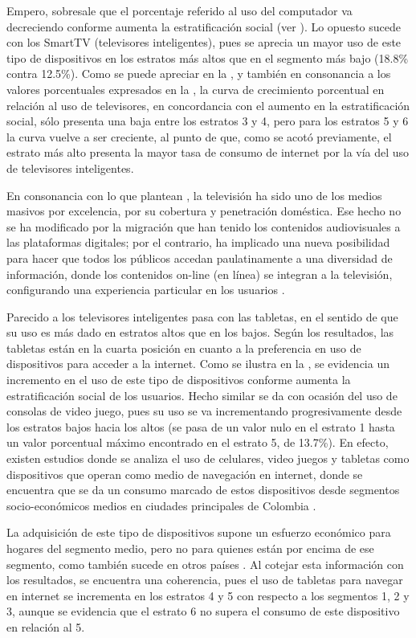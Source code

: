 \documentclass[spanish]{textolivre}
\begin{document}
Empero, sobresale que el porcentaje referido al uso del computador va decreciendo conforme aumenta la estratificación social (ver ). Lo opuesto sucede con los SmartTV (televisores inteligentes), pues se aprecia un mayor uso de este tipo de dispositivos en los estratos más altos que en el segmento más bajo (18.8\% contra 12.5\%). Como se puede apreciar en la , y también en consonancia a los valores porcentuales expresados en la , la curva de crecimiento porcentual en relación al uso de televisores, en concordancia con el aumento en la estratificación social, sólo presenta una baja entre los estratos 3 y 4, pero para los estratos 5 y 6 la curva vuelve a ser creciente, al punto de que, como se acotó previamente, el estrato más alto presenta la mayor tasa de consumo de internet por la vía del uso de televisores inteligentes.

En consonancia con lo que plantean \textcite{nunez2018}, la televisión ha sido uno de los medios masivos por excelencia, por su cobertura y penetración doméstica. Ese hecho no se ha modificado por la migración que han tenido los contenidos audiovisuales a las plataformas digitales; por el contrario, ha implicado una nueva posibilidad para hacer que todos los públicos accedan paulatinamente a una diversidad de información, donde los contenidos on-line (en línea) se integran a la televisión, configurando una experiencia particular en los usuarios \cite{harwig2000}.

Parecido a los televisores inteligentes pasa con las tabletas, en el sentido de que su uso es más dado en estratos altos que en los bajos. Según los resultados, las tabletas están en la cuarta posición en cuanto a la preferencia en uso de dispositivos para acceder a la internet. Como se ilustra en la , se evidencia un incremento en el uso de este tipo de dispositivos conforme aumenta la estratificación social de los usuarios. Hecho similar se da con ocasión del uso de consolas de video juego, pues su uso se va incrementando progresivamente desde los estratos bajos hacia los altos (se pasa de un valor nulo en el estrato 1 hasta un valor porcentual máximo encontrado en el estrato 5, de 13.7\%). En efecto, existen estudios donde se analiza el uso de celulares, video juegos y tabletas como dispositivos que operan como medio de navegación en internet, donde se encuentra que se da un consumo marcado de estos dispositivos desde segmentos socio-económicos medios en ciudades principales de Colombia \cite{aristizabal2020}.

La adquisición de este tipo de dispositivos supone un esfuerzo económico para hogares del segmento medio, pero no para quienes están por encima de ese segmento, como también sucede en otros países \cite{lareau2003, vincent2007}. Al cotejar esta información con los resultados, se encuentra una coherencia, pues el uso de tabletas para navegar en internet se incrementa en los estratos 4 y 5 con respecto a los segmentos 1, 2 y 3, aunque se evidencia que el estrato 6 no supera el consumo de este dispositivo en relación al 5.
\end{document}
